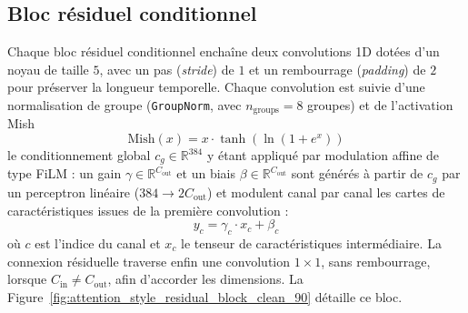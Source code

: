 \subsection*{Bloc résiduel conditionnel}
Chaque bloc résiduel conditionnel enchaîne deux convolutions 1D dotées d'un noyau de taille $5$, avec un pas (\textit{stride}) de $1$ et un rembourrage (\textit{padding}) de $2$ pour préserver la longueur temporelle. Chaque convolution est suivie d'une normalisation de groupe (\texttt{GroupNorm}, avec $n_{\text{groups}} = 8$ groupes) et de l'activation Mish
\begin{equation}
\text{Mish}(x) = x \cdot \tanh\left(\ln\left(1 + e^x\right)\right)
\label{eq:mish_activation}
\end{equation}
le conditionnement global $c_g \in \mathbb{R}^{384}$ y étant appliqué par modulation affine de type \ac{FiLM} : un gain $\gamma \in \mathbb{R}^{C_{\text{out}}}$ et un biais $\beta \in \mathbb{R}^{C_{\text{out}}}$ sont générés à partir de $c_g$ par un perceptron linéaire ($384 \to 2 C_{\text{out}}$) et modulent canal par canal les cartes de caractéristiques issues de la première convolution :
\begin{equation}\label{eq:film_modulation}
  y_c = \gamma_c \cdot x_c + \beta_c
\end{equation}
où $c$ est l'indice du canal et $x_c$ le tenseur de caractéristiques intermédiaire. La connexion résiduelle traverse enfin une convolution $1\times1$, sans rembourrage, lorsque $C_{\text{in}}\neq C_{\text{out}}$, afin d'accorder les dimensions. La Figure~\ref{fig:attention_style_residual_block_clean_90} détaille ce bloc.

